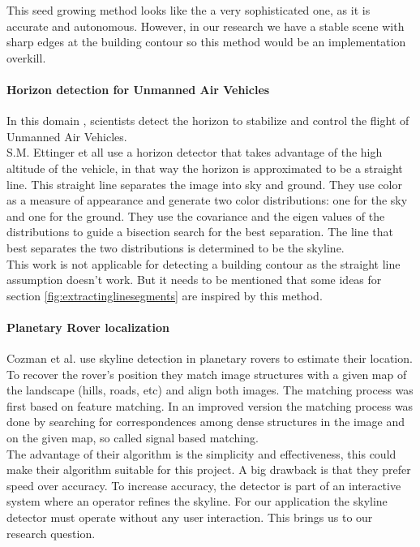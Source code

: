 This seed growing method looks like the a very sophisticated one, as it is
accurate and autonomous. However, in our research we have a stable scene with
sharp edges at the building contour so this method would be an implementation
overkill. 


\paragraph{Horizon detection for Unmanned Air Vehicles}
In this domain \cite{Guidedflight}, scientists detect the horizon to stabilize and control the
flight of Unmanned Air Vehicles.\\  
S.M. Ettinger et all \cite{Guidedflight} use a horizon detector that takes
advantage of the high altitude of the vehicle, in that way the horizon is
approximated to be a straight line. 
This straight line separates the image into sky and ground. They use color as
a measure of appearance and generate two color distributions: one for the sky
and one for the ground. They use the covariance and the eigen values of the
distributions to guide a bisection search for the best separation. The line that
best separates the two distributions is determined to be the skyline.\\

This work is not applicable for detecting a building contour as the straight
line assumption doesn't work. But it needs to be mentioned that some ideas for
section \ref{fig:extractinglinesegments} are inspired by this method.

\paragraph{Planetary Rover localization}
Cozman et al. \cite{Rover} use skyline detection in planetary rovers to estimate 
their location. 
To recover the rover's position they match image structures with a given map
of the landscape (hills, roads, etc) and align both images.
The matching process was first based on feature matching. In an improved version
the matching process was done by searching for correspondences among dense
structures in the image and on the given map, so called signal based matching.\\
The advantage of their algorithm is the simplicity and effectiveness, this
could make their algorithm suitable for this project. A big drawback is that
they prefer speed over accuracy. To increase accuracy, the detector is part
of an interactive system where an operator refines the skyline. For our
application the skyline detector must operate without any user interaction.
This brings us to our research question.

